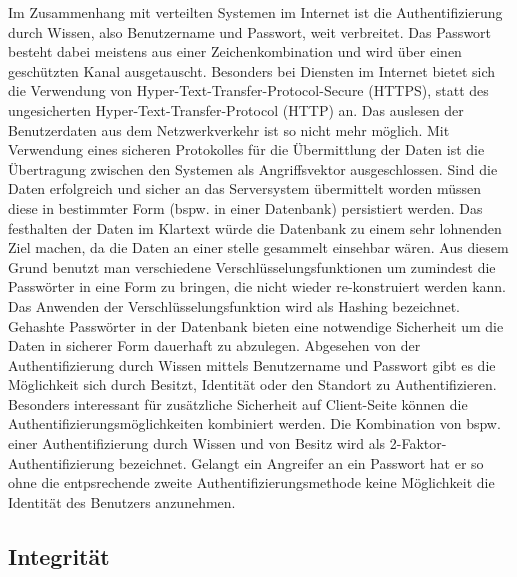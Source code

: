 \documentclass[utf8,biblatex]{lni}
\begin{document}
Im Zusammenhang mit verteilten Systemen im Internet ist die Authentifizierung durch Wissen,
also Benutzername und Passwort, weit verbreitet. 
Das Passwort besteht dabei meistens aus einer Zeichenkombination und wird über einen geschützten Kanal ausgetauscht. 
Besonders bei Diensten im Internet bietet sich die Verwendung von Hyper-Text-Transfer-Protocol-Secure (HTTPS), statt
des ungesicherten Hyper-Text-Transfer-Protocol (HTTP) an.
Das auslesen der Benutzerdaten aus dem Netzwerkverkehr ist so nicht mehr möglich. 
Mit Verwendung eines sicheren Protokolles für die Übermittlung der Daten ist die Übertragung zwischen den Systemen 
als Angriffsvektor ausgeschlossen. 
Sind die Daten erfolgreich und sicher an das Serversystem übermittelt worden müssen diese in bestimmter Form 
(bspw. in einer Datenbank) persistiert werden. 
Das festhalten der Daten im Klartext würde die Datenbank zu einem sehr lohnenden Ziel machen, da die Daten 
an einer stelle gesammelt einsehbar wären. 
Aus diesem Grund benutzt man verschiedene Verschlüsselungsfunktionen um zumindest die Passwörter in eine Form zu bringen,
die nicht wieder re-konstruiert werden kann. Das Anwenden der Verschlüsselungsfunktion wird 
als Hashing bezeichnet. Gehashte Passwörter in der Datenbank bieten eine notwendige Sicherheit um die Daten in sicherer Form 
dauerhaft zu abzulegen. Abgesehen von der Authentifizierung durch Wissen mittels Benutzername und Passwort gibt es die Möglichkeit sich durch 
Besitzt, Identität oder den Standort zu Authentifizieren. 
Besonders interessant für zusätzliche Sicherheit auf Client-Seite können die 
Authentifizierungsmöglichkeiten kombiniert werden. Die Kombination von bspw. einer Authentifizierung durch Wissen und von Besitz 
wird als 2-Faktor-Authentifizierung bezeichnet. Gelangt ein Angreifer an ein Passwort hat er so ohne die entpsrechende zweite 
Authentifizierungsmethode keine Möglichkeit die Identität des Benutzers anzunehmen. 

\subsection{Integrität}
\end{document}
